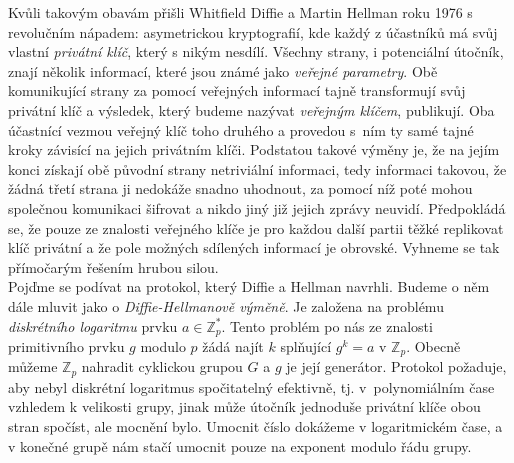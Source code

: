 \documentclass [12pt]{report}
\begin{document}
Kvůli takovým obavám přišli Whitfield Diffie a Martin Hellman \cite{Diffie} roku 1976 s revolučním nápadem: asymetrickou kryptografií, kde každý z účastníků má svůj vlastní \textit{privátní klíč}, který s nikým nesdílí. Všechny strany, i potenciální útočník, znají několik informací, které jsou známé jako \textit{veřejné parametry}. Obě komunikující strany za pomocí veřejných informací tajně transformují svůj privátní klíč a výsledek, který budeme nazývat \textit{veřejným klíčem}, publikují. Oba účastnící vezmou veřejný klíč toho druhého a provedou s~ním ty samé tajné kroky závisící na jejich privátním klíči. Podstatou takové výměny je, že na jejím konci získají obě původní strany netriviální informaci, tedy informaci takovou, že žádná třetí strana ji nedokáže snadno uhodnout, za pomocí níž poté mohou společnou komunikaci šifrovat a nikdo jiný již jejich zprávy neuvidí. Předpokládá se, že pouze ze znalosti veřejného klíče je pro každou další partii těžké replikovat klíč privátní a že pole možných sdílených informací je obrovské. Vyhneme se tak přímočarým řešením hrubou silou.\\

Pojďme se podívat na protokol, který Diffie a Hellman navrhli. Budeme o něm dále mluvit jako o \textit{Diffie-Hellmanově výměně}. Je založena na problému \textit{diskrétního logaritmu} prvku $a \in \mathbb{Z}_p^{*}$. Tento problém po nás ze znalosti primitivního prvku $g$ modulo $p$ žádá najít $k$ splňující $g^k = a$ v $\mathbb{Z}_p$. Obecně můžeme $\mathbb{Z}_p$ nahradit cyklickou grupou $G$ a $g$ je její generátor. Protokol požaduje, aby nebyl diskrétní logaritmus spočitatelný efektivně, tj. v~polynomiálním čase vzhledem k velikosti grupy, jinak může útočník jednoduše privátní klíče obou stran spočíst, ale mocnění bylo. Umocnit číslo dokážeme v logaritmickém čase, a v konečné grupě nám stačí umocnit pouze na exponent modulo řádu grupy. \\
\end{document}
